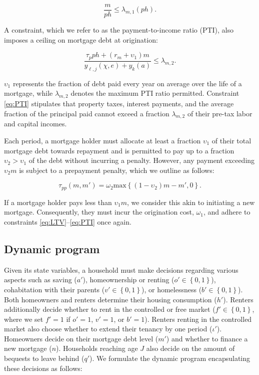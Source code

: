 \documentclass[parskip=full]{article}
\begin{document}
\begin{equation}\label{eq:LTV}
\frac{m}{p h} \leq \lambda_{m,1}(ph).
\end{equation}

\noindent A constraint, which we refer to as the payment-to-income ratio (PTI), also imposes a ceiling on mortgage debt at origination:

\begin{equation}\label{eq:PTI}
\frac{\tau_{p}ph+(r_{m}+\upsilon_{1})m}{y_{\ell,j}(\chi,e)+y_{k}(a)} \leq \lambda_{m,2}.
\end{equation}

\noindent $\upsilon_{1}$ represents the fraction of debt paid every year on average over the life of a mortgage, while $\lambda_{m,2}$ denotes the maximum PTI ratio permitted. Constraint \eqref{eq:PTI} stipulates that property taxes, interest payments, and the average fraction of the principal paid cannot exceed a fraction $\lambda_{m,2}$ of their pre-tax labor and capital incomes.

Each period, a mortgage holder must allocate at least a fraction $\upsilon_{1}$ of their total mortgage debt towards repayment and is permitted to pay up to a fraction $\upsilon_{2}>\upsilon_{1}$ of the debt without incurring a penalty. However, any payment exceeding $\upsilon_{2}m$ is subject to a prepayment penalty, which we outline as follows:

\begin{equation}\label{eq:prepayment_penalty}
\tau_{pp}(m,m')=\omega_{2}\mbox{max}\left\{(1-\upsilon_{2})m-m',0\right\}.
\end{equation}

\noindent If a mortgage holder pays less than $\upsilon_{1}m$, we consider this akin to initiating a new mortgage. Consequently, they must incur the origination cost, $\omega_{1}$, and adhere to constraints \eqref{eq:LTV}--\eqref{eq:PTI} once again.

\subsection{Dynamic program}\label{subsection:household_optimization}
Given its state variables, a household must make decisions regarding various aspects such as saving ($a'$), homeownership or renting ($o' \in \left\{0,1\right\}$), cohabitation with their parents ($v' \in \left\{0,1\right\}$), or homelessness ($b' \in \left\{0,1\right\}$). Both homeowners and renters determine their housing consumption ($h'$). Renters additionally decide whether to rent in the controlled or free market ($f' \in \left\{0,1\right\}$, where we set $f'=1$ if $o'=1$, $v'=1$, or $b'=1$). Renters renting in the controlled market also choose whether to extend their tenancy by one period ($\iota'$). Homeowners decide on their mortgage debt level ($m'$) and whether to finance a new mortgage ($n$). Households reaching age $J$ also decide on the amount of bequests to leave behind ($q'$). We formulate the dynamic program encapsulating these decisions as follows:
\end{document}
